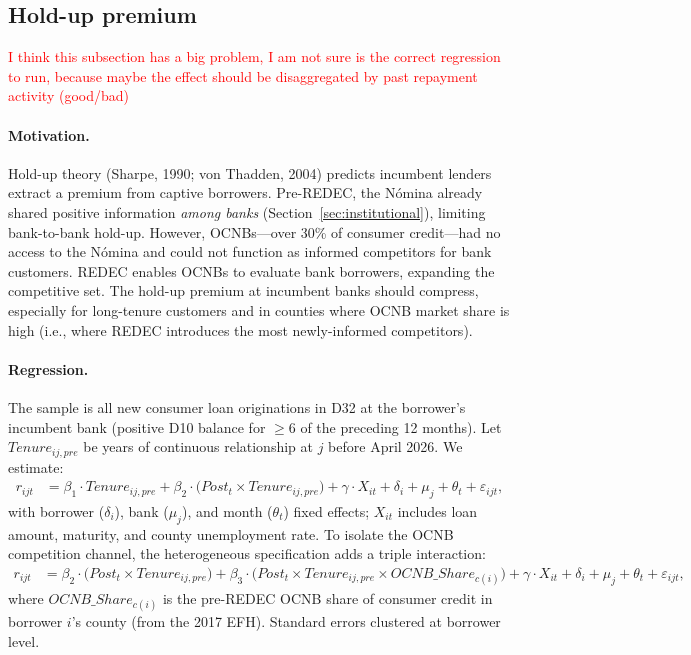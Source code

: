 \documentclass[12pt]{article}
\theoremstyle{plain}
\theoremstyle{plain}
\begin{document}
\subsection{Hold-up premium}

\textcolor{red}{I think this subsection has a big problem, I am not sure is the correct regression to run, because maybe the effect should be disaggregated by past repayment activity  (good/bad)}


\paragraph{Motivation.} Hold-up theory (Sharpe, 1990; von Thadden, 2004) predicts incumbent lenders extract a premium from captive borrowers. Pre-REDEC, the N\'omina already shared positive information \textit{among banks} (Section~\ref{sec:institutional}), limiting bank-to-bank hold-up. However, OCNBs---over 30\% of consumer credit---had no access to the N\'omina and could not function as informed competitors for bank customers. REDEC enables OCNBs to evaluate bank borrowers, expanding the competitive set. The hold-up premium at incumbent banks should compress, especially for long-tenure customers and in counties where OCNB market share is high (i.e., where REDEC introduces the most newly-informed competitors).

\paragraph{Regression.} The sample is all new consumer loan originations in D32 at the borrower's incumbent bank (positive D10 balance for $\geq 6$ of the preceding 12 months). Let $Tenure_{ij,pre}$ be years of continuous relationship at $j$ before April 2026. We estimate:
\begin{align}
    r_{ijt} &= \beta_1 \cdot Tenure_{ij,pre} + \beta_2 \cdot \bigl(Post_t \times Tenure_{ij,pre}\bigr) + \gamma \cdot X_{it} + \delta_i + \mu_j + \theta_t + \varepsilon_{ijt},
\label{eq:holdup_baseline}
\end{align}
with borrower ($\delta_i$), bank ($\mu_j$), and month ($\theta_t$) fixed effects; $X_{it}$ includes loan amount, maturity, and county unemployment rate. To isolate the OCNB competition channel, the heterogeneous specification adds a triple interaction:
\begin{align}
    r_{ijt} &= \beta_2 \cdot \bigl(Post_t \times Tenure_{ij,pre}\bigr) + \beta_3 \cdot \bigl(Post_t \times Tenure_{ij,pre} \times OCNB\_Share_{c(i)}\bigr) + \gamma \cdot X_{it} + \delta_i + \mu_j + \theta_t + \varepsilon_{ijt},
\label{eq:holdup_ocnb}
\end{align}
where $OCNB\_Share_{c(i)}$ is the pre-REDEC OCNB share of consumer credit in borrower $i$'s county (from the 2017 EFH). Standard errors clustered at borrower level.
\end{document}
